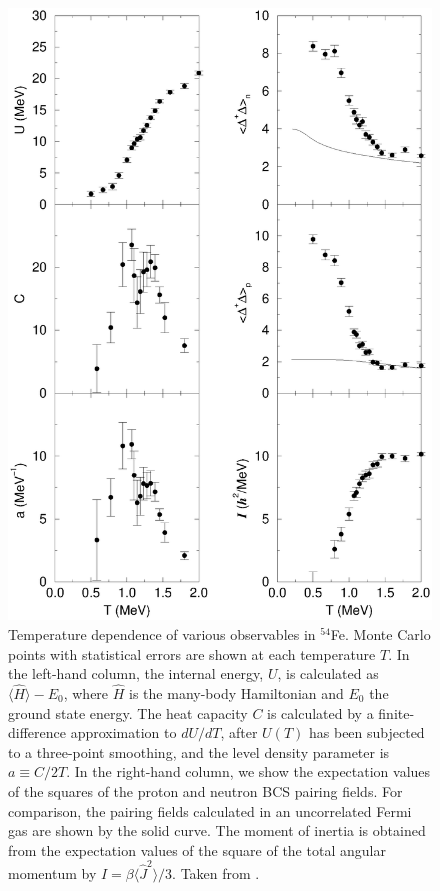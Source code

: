 \documentclass[rmp,aps,floatfix]{revtex4}
\begin{document}
\begin{figure}
\includegraphics[scale=0.5,angle=0]{dean_hjorthjensen_fig20.ps}
\caption{Temperature dependence of various observables in ${}^{54}$Fe. Monte
Carlo points with statistical errors are shown at each temperature $T$. In
the left-hand column, the internal energy, $U$,
is calculated as $\langle {\hat H}
\rangle -E_0$, where ${\hat H}$ is the many-body Hamiltonian and $E_0$ the
ground state energy. The heat capacity $C$ is calculated by a finite-difference
approximation to $dU/dT$, after $U(T)$ has been subjected to a three-point
smoothing, and the level density parameter is $a\equiv C/2T$.
In the right-hand column, we show the expectation values of the
squares of the proton and neutron BCS pairing fields.
For comparison, the pairing fields
calculated in an uncorrelated Fermi gas are shown by the solid curve. The
moment of inertia is obtained from the expectation values of the square of
the total angular momentum by $I=\beta \langle {\hat J}^2 \rangle/3$.
Taken from  \protect\cite{Dean95}. \label{fig_810}}
\end{figure}
\end{document}
